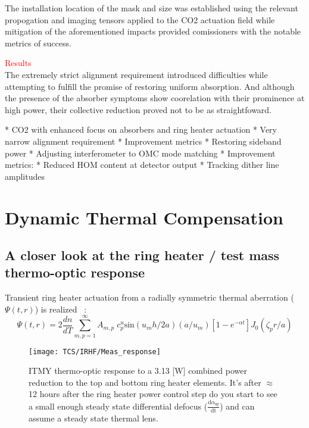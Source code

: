 The installation location of the mask and size was established using the relevant propogation and imaging tensors applied to the CO2 actuation field while mitigation of the aforementioned impacts provided comissioners with the notable metrics of success.


\textcolor{red}{Results}
\\
The extremely strict alignment requirement introduced difficulties while attempting to fulfill the promise of restoring uniform absorption. And although the presence of the absorber symptoms show coorelation with their prominence at high power, their collective reduction proved not to be as straightfoward.
	
	* CO2 with enhanced focus on absorbers and ring heater actuation
		* Very narrow alignment requirement
		* Improvement metrics
			* Restoring sideband power	
	* Adjusting interferometer to OMC mode matching
		* Improvement metrics:
			* Reduced HOM content at detector output
			* Tracking dither line amplitudes


\section{Dynamic Thermal Compensation}
\subsection{A closer look at the ring heater / test mass thermo-optic response}
Transient ring heater actuation from a radially symmetric thermal aberration ($\Psi(t,r)$) is realized ~\cite{ramette:2016}:
\begin{equation}
	\Psi(t,r)=2\frac{dn}{dT} \sum^{\infty}_{m,p = 1} A_{m,p} \; c^{u}_{p} \mathrm{sin}(u_m h /2a) (a/u_m)[1-e^{-\alpha t}] J_0(\zeta_p r/a)
\end{equation}

\begin{figure}[H]
     \texttt{[image: TCS/IRHF/Meas\_response]}
     \caption{ITMY thermo-optic response to a 3.13 [W] combined power reduction to the top and bottom ring heater elements. It's after $\approx$ 12 hours after the ring heater power control step do you start to see a small enough steady state differential defocus ($\frac{\mathrm{d} \alpha_\mathrm{sp}}{\mathrm{dt}}$) and can assume a steady state thermal lens.}
     \label{fig:RHresp}
\end{figure}

